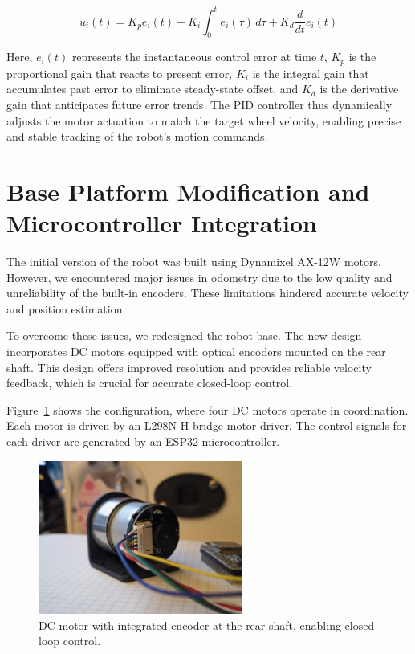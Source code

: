 \[
u_i(t) = K_p e_i(t) + K_i \int_{0}^{t} e_i(\tau)\, d\tau + K_d \frac{d}{dt} e_i(t)
\]

Here, \( e_i(t) \) represents the instantaneous control error at time \( t \), \( K_p \) is the proportional gain that reacts to present error, \( K_i \) is the integral gain that accumulates past error to eliminate steady-state offset, and \( K_d \) is the derivative gain that anticipates future error trends. The PID controller thus dynamically adjusts the motor actuation to match the target wheel velocity, enabling precise and stable tracking of the robot's motion commands.
\section{Base Platform Modification and Microcontroller Integration}
The initial version of the robot was built using Dynamixel AX-12W motors. However, we encountered major issues in odometry due to the low quality and unreliability of the built-in encoders. These limitations hindered accurate velocity and position estimation.

To overcome these issues, we redesigned the robot base. The new design incorporates DC motors equipped with optical encoders mounted on the rear shaft. This design offers improved resolution and provides reliable velocity feedback, which is crucial for accurate closed-loop control.

Figure~\ref{fig:encoder-mounting} shows the configuration, where four DC motors operate in coordination. Each motor is driven by an L298N H-bridge motor driver. The control signals for each driver are generated by an ESP32 microcontroller.

\begin{figure}[H]
    \centering
    \includegraphics[width=0.6\textwidth]{assets/images/hardware/dc-motor2.jpeg}
    \caption{DC motor with integrated encoder at the rear shaft, enabling closed-loop control.}
    \label{fig:encoder-mounting}
\end{figure}

